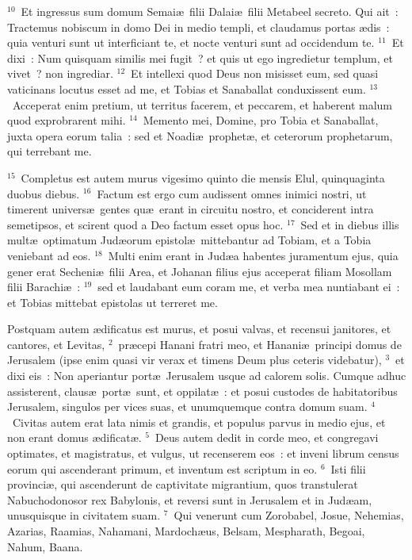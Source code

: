 ${}^{10}$~Et ingressus sum domum Semai\ae\ filii Dalai\ae\ filii Metabeel secreto. Qui ait~: Tractemus nobiscum in domo Dei in medio templi, et claudamus portas \ae dis~: quia venturi sunt ut interficiant te, et nocte venturi sunt ad occidendum te.
${}^{11}$~Et dixi~: Num quisquam similis mei fugit~? et quis ut ego ingredietur templum, et vivet~? non ingrediar.
${}^{12}$~Et intellexi quod Deus non misisset eum, sed quasi vaticinans locutus esset ad me, et Tobias et Sanaballat conduxissent eum.
${}^{13}$~Acceperat enim pretium, ut territus facerem, et peccarem, et haberent malum quod exprobrarent mihi.
${}^{14}$~Memento mei, Domine, pro Tobia et Sanaballat, juxta opera eorum talia~: sed et Noadi\ae\ prophet\ae , et ceterorum prophetarum, qui terrebant me.


${}^{15}$~Completus est autem murus vigesimo quinto die mensis Elul, quinquaginta duobus diebus.
${}^{16}$~Factum est ergo cum audissent omnes inimici nostri, ut timerent univers\ae\ gentes qu\ae\ erant in circuitu nostro, et conciderent intra semetipsos, et scirent quod a Deo factum esset opus hoc.
${}^{17}$~Sed et in diebus illis mult\ae\ optimatum Jud\ae orum epistol\ae\ mittebantur ad Tobiam, et a Tobia veniebant ad eos.
${}^{18}$~Multi enim erant in Jud\ae a habentes juramentum ejus, quia gener erat Secheni\ae\ filii Area, et Johanan filius ejus acceperat filiam Mosollam filii Barachi\ae~:
${}^{19}$~sed et laudabant eum coram me, et verba mea nuntiabant ei~: et Tobias mittebat epistolas ut terreret me.

\lettrine[lines=10,image=true,loversize=0.05,lraise=-0.03]{P}{}ostquam autem \ae dificatus est murus, et posui valvas, et recensui janitores, et cantores, et Levitas,
${}^{2}$~pr\ae cepi Hanani fratri meo, et Hanani\ae\ principi domus de Jerusalem (ipse enim quasi vir verax et timens Deum plus ceteris videbatur),
${}^{3}$~et dixi eis~: Non aperiantur port\ae\ Jerusalem usque ad calorem solis. Cumque adhuc assisterent, claus\ae\ port\ae\ sunt, et oppilat\ae~: et posui custodes de habitatoribus Jerusalem, singulos per vices suas, et unumquemque contra domum suam.
${}^{4}$~Civitas autem erat lata nimis et grandis, et populus parvus in medio ejus, et non erant domus \ae dificat\ae .
${}^{5}$~Deus autem dedit in corde meo, et congregavi optimates, et magistratus, et vulgus, ut recenserem eos~: et inveni librum census eorum qui ascenderant primum, et inventum est scriptum in eo.
${}^{6}$~Isti filii provinci\ae , qui ascenderunt de captivitate migrantium, quos transtulerat Nabuchodonosor rex Babylonis, et reversi sunt in Jerusalem et in Jud\ae am, unusquisque in civitatem suam.
${}^{7}$~Qui venerunt cum Zorobabel, Josue, Nehemias, Azarias, Raamias, Nahamani, Mardoch\ae us, Belsam, Mespharath, Begoai, Nahum, Baana.

